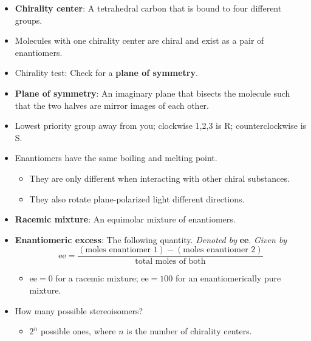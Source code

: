 \documentclass[../notes.tex]{subfiles}
\begin{document}
\begin{itemize}
\begin{itemize}
    \end{itemize}
    \item \textbf{Chirality center}: A tetrahedral carbon that is bound to four different groups.
    \item Molecules with one chirality center are chiral and exist as a pair of enantiomers.
    \item Chirality test: Check for a \textbf{plane of symmetry}.
    \item \textbf{Plane of symmetry}: An imaginary plane that bisects the molecule such that the two halves are mirror images of each other.
    \item Lowest priority group away from you; clockwise 1,2,3 is R; counterclockwise is S.
    \item Enantiomers have the same boiling and melting point.
    \begin{itemize}
        \item They are only different when interacting with other chiral substances.
        \item They also rotate plane-polarized light different directions.
    \end{itemize}
    \item \textbf{Racemic mixture}: An equimolar mixture of enantiomers.
    \item \textbf{Enantiomeric excess}: The following quantity. \emph{Denoted by} \textbf{ee}. \emph{Given by}
    \begin{equation*}
        \text{ee} = \frac{(\text{moles enantiomer 1})-(\text{moles enantiomer 2})}{\text{total moles of both}}
    \end{equation*}
    \begin{itemize}
        \item $\text{ee}=0$ for a racemic mixture; $\text{ee}=100$ for an enantiomerically pure mixture.
    \end{itemize}
    \item How many possible stereoisomers?
    \begin{itemize}
        \item $2^n$ possible ones, where $n$ is the number of chirality centers.
    \end{itemize}
\end{itemize}
\end{document}
